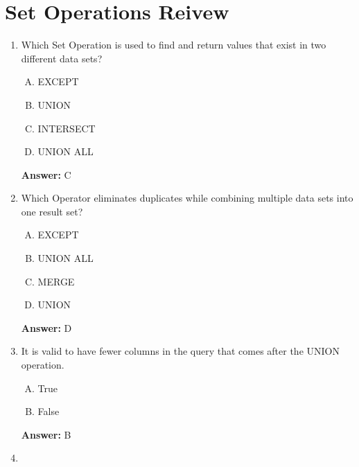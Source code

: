 \documentclass[12pt]{article}
\begin{document}
\bigskip

\section{Set Operations Reivew}

\bigskip

\begin{enumerate}[1.]
    \item

    Which Set Operation is used to find and return values that exist in two
    different data sets?

    \begin{enumerate}[A.]
        \item EXCEPT
        \item UNION
        \item INTERSECT
        \item UNION ALL
    \end{enumerate}

    \bigskip

    \textbf{Answer:} C

    \item

    Which Operator eliminates duplicates while combining multiple data sets into
    one result set?

    \begin{enumerate}[A.]
        \item EXCEPT
        \item UNION ALL
        \item MERGE
        \item UNION
    \end{enumerate}

    \bigskip

    \textbf{Answer:} D

    \item

    It is valid to have fewer columns in the query that comes after the UNION
    operation.

    \begin{enumerate}[A.]
        \item True
        \item False
    \end{enumerate}

    \bigskip

    \textbf{Answer:} B

    \item


\end{enumerate}
\end{document}
